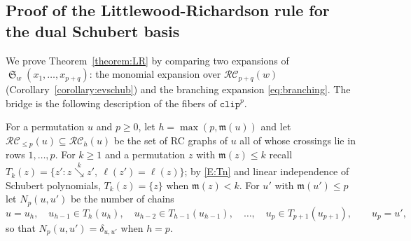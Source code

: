 \documentclass{amsart}
\makeatletter
\newcommand{\sqcupplus@inner}[2]{%
  \vcenter{\hbox{\ooalign{%
    \hfil$\m@th#1\sqcup$\hfil\cr
    \hfil\raisebox{0.15ex}{$\m@th#1\scriptscriptstyle+$}\hfil\cr
  }}}%
}
\newcommand{\sqcupplus}{\mathbin{\mathpalette\sqcupplus@inner\relax}}
\theoremstyle{definition}
\theoremstyle{remark}
\numberwithin{equation}{subsection}
\DeclareMathOperator{\sch}{\mathfrak{S}}
\newcommand{\downvar}[1]{\stackrel{#1}{\searrow}}
\newcommand{\wof}[1]{w_{#1}}
\newcommand{\hr}{\mathtt{ht}}
\newcommand{\clp}{\mathtt{clip}}
\newcommand{\BRC}{\mathcal{BRC}}
\newcommand{\RC}{\mathcal{RC}}
\newcommand{\maxd}{\mathfrak{m}}
\makeatother
\begin{document}
\subsection{Proof of the Littlewood-Richardson rule for the dual Schubert basis}

We prove Theorem~\ref{theorem:LR} by comparing two expansions of $\sch_w(x_1,\ldots,x_{p+q})$: the monomial expansion over $\RC_{p+q}(w)$ (Corollary~\ref{corollary:evschub}) and the branching expansion \eqref{eq:branching}. The bridge is the following description of the fibers of $\clp^p$.

For a permutation $u$ and $p\geq 0$, let $h=\max(p,\maxd(u))$ and let $\RC_{\leq p}(u)\subseteq\RC_h(u)$ be the set of RC graphs of $u$ all of whose crossings lie in rows $1,\ldots,p$. For $k\geq 1$ and a permutation $z$ with $\maxd(z)\leq k$ recall $T_k(z)=\{z':z\downvar{k}z',\ \ell(z')=\ell(z)\}$; by \eqref{E:Tn} and linear independence of Schubert polynomials, $T_k(z)=\{z\}$ when $\maxd(z)<k$. For $u'$ with $\maxd(u')\leq p$ let $N_p(u,u')$ be the number of chains
$$u=u_h,\quad u_{h-1}\in T_h(u_h),\quad u_{h-2}\in T_{h-1}(u_{h-1}),\quad\ldots,\quad u_p\in T_{p+1}(u_{p+1}),\qquad u_p=u'\text{,}$$
so that $N_p(u,u')=\delta_{u,u'}$ when $h=p$.
\end{document}
